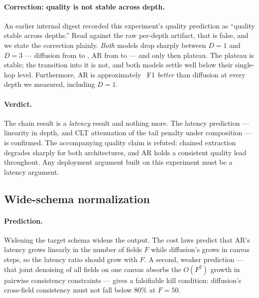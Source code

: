 \paragraph{Correction: quality is not stable across depth.} An earlier internal
digest recorded this experiment's quality prediction as ``quality stable across
depths.'' Read against the raw per-depth artifact, that is false, and we state
the correction plainly. \emph{Both} models drop sharply between $D=1$ and $D=3$
--- diffusion from  to
, AR from  to
 --- and only then plateau. The plateau is stable;
the transition into it is not, and both models settle well below their
single-hop level. Furthermore, AR is
approximately ~F1 \emph{better} than diffusion at every
depth we measured, including $D=1$.

\paragraph{Verdict.} The chain result is a \emph{latency} result and nothing
more. The latency prediction --- linearity in depth, and CLT attenuation of the
tail penalty under composition --- is confirmed. The accompanying quality claim
is refuted: chained extraction degrades sharply for both architectures, and AR
holds a consistent quality lead throughout. Any deployment argument built on
this experiment must be a latency argument.

\subsection{Wide-schema normalization}
\label{sec:app-wide}

\paragraph{Prediction.} Widening the target schema widens the output. The cost
laws predict that AR's latency grows linearly in the number of fields $F$ while
diffusion's grows in canvas steps, so the latency ratio should grow with $F$.
A second, weaker prediction --- that joint denoising of all fields on one canvas
absorbs the $O(F^2)$ growth in pairwise consistency constraints --- gives a
falsifiable kill condition: diffusion's cross-field consistency must not fall
below $80\%$ at $F=50$.

